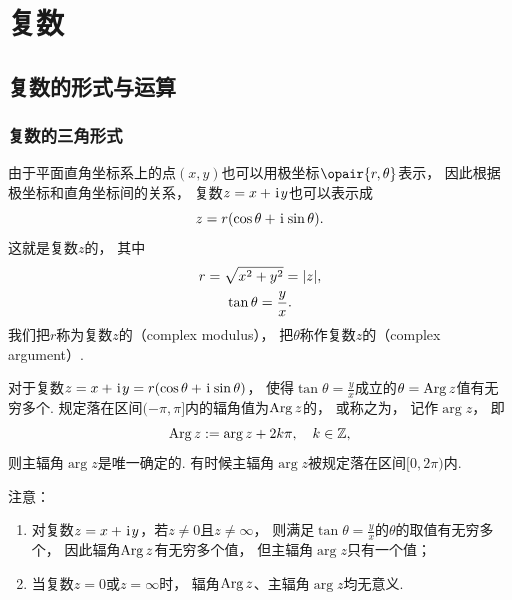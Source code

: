 \chapter{复数}
\section{复数的形式与运算}
\subsection{复数的三角形式}
\begin{definition}%
由于平面直角坐标系上的点\((x,y)\)也可以用极坐标\(\opair{r,\theta}\)表示，
因此根据极坐标和直角坐标间的关系，
复数\(z = x + \kern1pt\mathrm{i}\kern1pt y\)也可以表示成\begin{equation*}
	z = r(\cos\theta+ \kern1pt\mathrm{i}\kern1pt \sin\theta).
\end{equation*}
这就是复数\(z\)的，
其中\begin{gather*}
	r = \sqrt{x^2+y^2} = \abs{z}, \\
	\tan\theta = \frac{y}{x}.
\end{gather*}
我们把\(r\)称为复数\(z\)的（complex modulus），
把\(\theta\)称作复数\(z\)的（complex argument）.
\end{definition}

对于复数\(z = x + \kern1pt\mathrm{i}\kern1pt y=r(\cos\theta+ \kern1pt\mathrm{i}\kern1pt \sin\theta)\)，
使得\(\tan\theta=\frac{y}{x}\)成立的\(\theta=\operatorname{Arg} z\)值有无穷多个.
规定落在区间\((-\pi,\pi]\)内的辐角值为\(\operatorname{Arg} z\)的，
或称之为，
记作\(\arg{z}\)，
即\begin{equation*}
	\operatorname{Arg} z := \arg{z} + 2k\pi, \quad k\in\mathbb{Z},
\end{equation*}
则主辐角\(\arg{z}\)是唯一确定的.
有时候主辐角\(\arg{z}\)被规定落在区间\([0,2\pi)\)内.

注意：\begin{enumerate}
	\item 对复数\(z = x + \kern1pt\mathrm{i}\kern1pt y\)，若\(z \neq 0\)且\(z \neq \infty\)，
	则满足\(\tan \theta = \frac{y}{x}\)的\(\theta\)的取值有无穷多个，
	因此辐角\(\operatorname{Arg} z\)有无穷多个值，
	但主辐角\(\arg z\)只有一个值；
	\item 当复数\(z = 0\)或\(z = \infty\)时，
	辐角\(\operatorname{Arg} z\)、主辐角\(\arg{z}\)均无意义.
\end{enumerate}

